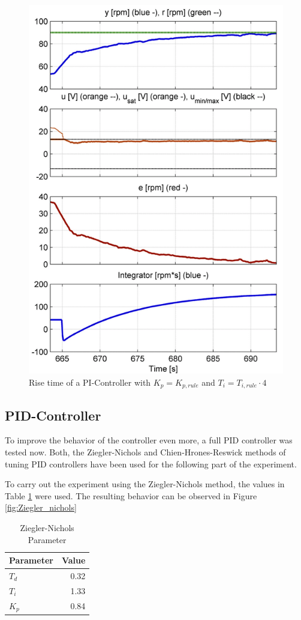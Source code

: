 \begin{figure}[H]
\begin{center}
\includegraphics[width=0.5\linewidth]{images/general/PI/PI_RiseTime4}
\end{center}
\caption{Rise time of a PI-Controller with $K_{p}= K_{p,rule}$ and $T_{i}=T_{i,rule}\cdot4$}
\label{fig:PI_RiseTime4}
\end{figure}

\clearpage
\subsection{PID-Controller}

To improve the behavior of the controller even more, a full PID controller was tested now.
Both, the Ziegler-Nichols and Chien-Hrones-Reswick methods of tuning PID controllers have been used for the following part of the experiment.

To carry out the experiment using the Ziegler-Nichols method, the values in Table \ref{tab:zn_params} were used.
The resulting behavior can be observed in Figure \ref{fig:Ziegler_nichols}

\begin{table}[H]
\begin{center}
\begin{tabular}{ l|r }
 \hline
 Parameter & Value\\
 \hline
 \hline
 $T_{d}$ & 0.32\\
 \hline
 $T_{i}$ & 1.33\\
 \hline
 $K_{p}$ & 0.84\\
 \hline
\end{tabular}
\end{center}
\caption{Ziegler-Nichols Parameter}
\label{tab:zn_params}
\end{table}

